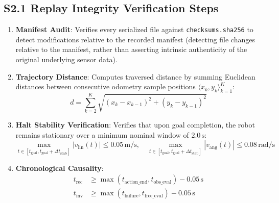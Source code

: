 \documentclass[10pt]{article}
\begin{document}
\subsection{S2.1 Replay Integrity Verification Steps}
\begin{enumerate}
    \item \textbf{Manifest Audit}: Verifies every serialized file against \texttt{checksums.sha256} to detect modifications relative to the recorded manifest (detecting file changes relative to the manifest, rather than asserting intrinsic authenticity of the original underlying sensor data).
    \item \textbf{Trajectory Distance}: Computes traversed distance by summing Euclidean distances between consecutive odometry sample positions $\langle x_k, y_k \rangle_{k=1}^K$:
    \begin{equation}
    d = \sum_{k=2}^K \sqrt{(x_k - x_{k-1})^2 + (y_k - y_{k-1})^2}
    \end{equation}
    \item \textbf{Halt Stability Verification}: Verifies that upon goal completion, the robot remains stationary over a minimum nominal window of $2.0\,\text{s}$:
    \begin{equation}
    \max_{t \in [t_{\text{goal}}, t_{\text{goal}} + \Delta t_{\text{stab}}]} |v_{\text{lin}}(t)| \le 0.05\,\text{m/s}, \quad \max_{t \in [t_{\text{goal}}, t_{\text{goal}} + \Delta t_{\text{stab}}]} |v_{\text{ang}}(t)| \le 0.08\,\text{rad/s}
    \end{equation}
    \item \textbf{Chronological Causality}:
    \begin{align}
    t_{\text{rec}} &\ge \max(t_{\text{action\_end}}, t_{\text{obs\_eval}}) - 0.05\,\text{s} \\
    t_{\text{inv}} &\ge \max(t_{\text{failure}}, t_{\text{free\_eval}}) - 0.05\,\text{s}
    \end{align}
\end{enumerate}
\end{document}
